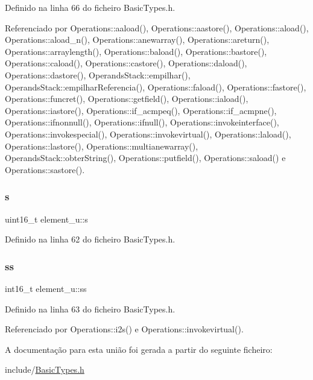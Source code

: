 Definido na linha 66 do ficheiro Basic\+Types.\+h.



Referenciado por Operations\+::aaload(), Operations\+::aastore(), Operations\+::aload(), Operations\+::aload\+\_\+n(), Operations\+::anewarray(), Operations\+::areturn(), Operations\+::arraylength(), Operations\+::baload(), Operations\+::bastore(), Operations\+::caload(), Operations\+::castore(), Operations\+::daload(), Operations\+::dastore(), Operands\+Stack\+::empilhar(), Operands\+Stack\+::empilhar\+Referencia(), Operations\+::faload(), Operations\+::fastore(), Operations\+::funcret(), Operations\+::getfield(), Operations\+::iaload(), Operations\+::iastore(), Operations\+::if\+\_\+acmpeq(), Operations\+::if\+\_\+acmpne(), Operations\+::ifnonnull(), Operations\+::ifnull(), Operations\+::invokeinterface(), Operations\+::invokespecial(), Operations\+::invokevirtual(), Operations\+::laload(), Operations\+::lastore(), Operations\+::multianewarray(), Operands\+Stack\+::obter\+String(), Operations\+::putfield(), Operations\+::saload() e Operations\+::sastore().

\mbox{\label{unionelement__u_a85c036f57770aeab7ed90947ffdfda53}} 
\subsubsection{\texorpdfstring{s}{s}}
{\footnotesize\ttfamily uint16\+\_\+t element\+\_\+u\+::s}



Definido na linha 62 do ficheiro Basic\+Types.\+h.

\mbox{\label{unionelement__u_ab90ee55202fd11a2dc3cf48c74e55dab}} 
\subsubsection{\texorpdfstring{ss}{ss}}
{\footnotesize\ttfamily int16\+\_\+t element\+\_\+u\+::ss}



Definido na linha 63 do ficheiro Basic\+Types.\+h.



Referenciado por Operations\+::i2s() e Operations\+::invokevirtual().



A documentação para esta união foi gerada a partir do seguinte ficheiro\+:\begin{DoxyCompactItemize}
\item 
include/\hyperlink{BasicTypes_8h}{Basic\+Types.\+h}\end{DoxyCompactItemize}
